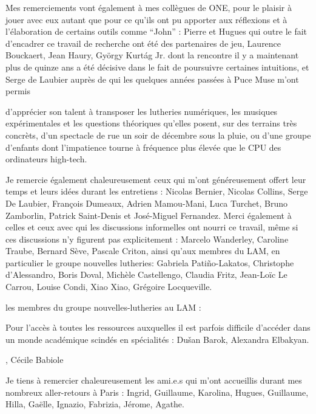 
Mes remerciements vont également à mes collègues de ONE, pour le plaisir à jouer avec eux autant que pour ce qu'ils ont pu apporter aux réflexions et à l'élaboration de certains outils comme ``John'' : Pierre et Hugues qui outre le fait d'encadrer ce travail de recherche ont été des partenaires de jeu, Laurence Bouckaert, Jean Haury, György Kurtág Jr. dont la rencontre il y a maintenant plus de quinze ans a été décisive dans le fait de poursuivre certaines intuitions, et Serge de Laubier auprès de qui les quelques années passées à Puce Muse m'ont permis

 d'apprécier son talent à transposer les lutheries numériques, les musiques expérimentales et les questions théoriques qu'elles posent, sur des terrains très concrèts, d'un spectacle de rue un soir de décembre sous la pluie, ou d'une groupe d'enfants dont l'impatience tourne à fréquence plus élevée que le CPU des ordinateurs high-tech.

Je remercie également chaleureusement ceux qui m'ont généreusement offert leur temps et leurs idées durant les entretiens : Nicolas Bernier, Nicolas Collins, Serge De Laubier, François Dumeaux, Adrien Mamou-Mani, Luca Turchet, Bruno Zamborlin, Patrick Saint-Denis et José-Miguel Fernandez.
Merci également à celles et ceux avec qui les discussions informelles ont nourri ce travail, même si ces discussions n'y figurent pas explicitement : Marcelo Wanderley, Caroline Traube, Bernard Sève, Pascale Criton, ainsi qu'aux membres du LAM, en particulier le groupe nouvelles lutheries: Gabriela Patiño-Lakatos, Christophe d'Alessandro, Boris Doval, Michèle Castellengo, Claudia Fritz, Jean-Loïc Le Carrou, Louise Condi, Xiao Xiao, Grégoire Locqueville.

les membres du groupe nouvelles-lutheries au LAM : 

Pour l'accès à toutes les ressources auxquelles il est parfois difficile d'accéder dans un monde académique scindés en spécialités : Dušan Barok, Alexandra Elbakyan.


, Cécile Babiole

Je tiens à remercier chaleureusement les ami.e.s qui m'ont accueillis durant mes nombreux aller-retours à Paris : Ingrid, Guillaume, Karolina, Hugues, Guillaume, Hilla, Gaëlle, Ignazio, Fabrizia, Jérome, Agathe. 


